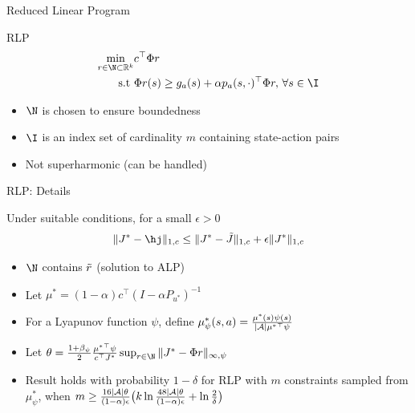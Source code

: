 \documentclass[10pt,handout]{beamer}
\begin{document}
\begin{frame}[fragile]{Reduced Linear Program}
\begin{block}{RLP \cite{de2004constraint}}
\begin{align*}
\min_{r\in \N\subset\R^k} &c^\top \Phi r\\
\text{s.t}\mb &\Phi r (s)\geq g_a(s)+\alpha p_a(s,\cdot)^\top \Phi r,\,\forall s\in \I
\end{align*}

\begin{itemize}
\item $\N$ is chosen to ensure boundedness
\item $\I$ is an index set of cardinality $m$ containing state-action pairs
\item Not superharmonic (can be handled)
\end{itemize}
\end{block}
\end{frame}
\begin{frame}[fragile]{RLP: Details}
\begin{block}{\cite{de2004constraint}}
Under suitable conditions, for a small $\epsilon>0$
\begin{align*}
\norm{J^*-\hj}_{1,c}\leq \norm{J^*-\tj}_{1,c}+\epsilon\norm{J^*}_{1,c}
\end{align*}
\end{block}
\begin{itemize}
\item $\N$ contains $\tilde{r}$ (solution to ALP)
\item Let $\mu^*=(1-\alpha)c^\top (I-\alpha P_{u^*})^{-1}$
\item For a Lyapunov function $\psi$, define $\mu^*_{\psi}(s,a)=\frac{\mu^*(s)\psi(s)}{|\mathcal{A}|{\mu^*}^\top \psi}$
\item Let $\theta=\frac{1+\beta_{\psi}}{2}\frac{{\mu^*}^\top \psi}{c^\top J^*}\sup_{r\in \N}\norm{J^*-\Phi r}_{\infty,\psi}$
\item Result holds with probability $1-\delta$ for RLP with $m$ constraints sampled from $\mu^*_{\psi}$, when $m\geq \frac{16|\mathcal{A}|\theta}{(1-\alpha)\epsilon}\big(k\ln \frac{48|\mathcal{A}|\theta}{(1-\alpha)\epsilon}+\ln\frac{2}{\delta}\big)$
\end{itemize}
\end{frame}
\end{document}
